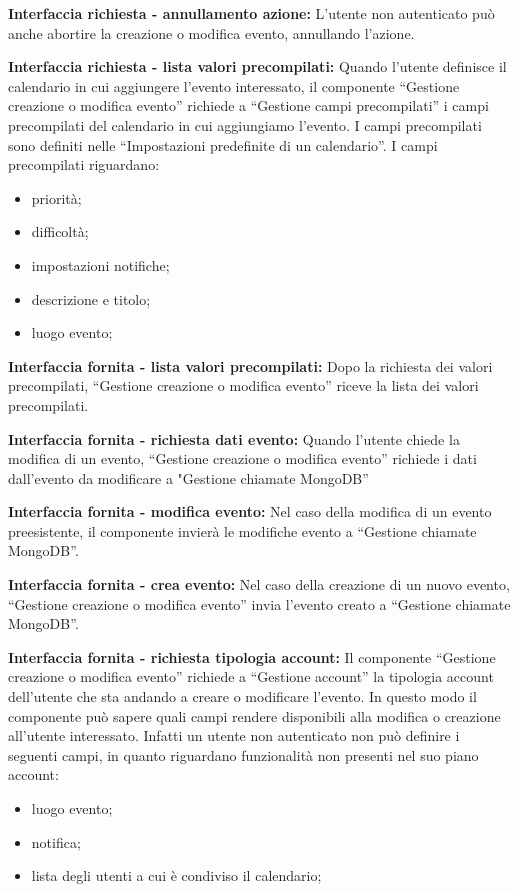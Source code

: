 \begin{listaPersonale}[]{}
    \textbf{Interfaccia richiesta - annullamento azione:} L'utente non autenticato può anche abortire la creazione o modifica evento, annullando l'azione.

    \textbf{Interfaccia richiesta - lista valori precompilati:} Quando l'utente definisce il calendario in cui aggiungere l'evento interessato, il componente “Gestione creazione o modifica evento” richiede a “Gestione campi precompilati” i campi precompilati del calendario in cui aggiungiamo l'evento. I campi precompilati sono definiti nelle “Impostazioni predefinite di un calendario”.
    I campi precompilati riguardano:
    \begin{itemize}
        \item priorità;
        \item difficoltà;
        \item impostazioni notifiche;
        \item descrizione e titolo;
        \item luogo evento;
    \end{itemize}

    \textbf{Interfaccia fornita - lista valori precompilati:}  Dopo la richiesta dei valori precompilati, “Gestione creazione o modifica evento” riceve la lista dei valori precompilati.

    \textbf{Interfaccia fornita - richiesta dati evento:} Quando l'utente chiede la modifica di un evento, “Gestione creazione o modifica evento” richiede i dati dall'evento da modificare a "Gestione chiamate MongoDB”

    \textbf{Interfaccia fornita - modifica evento:} Nel caso della modifica di un evento preesistente, il componente invierà le modifiche evento a “Gestione chiamate MongoDB”.

    \textbf{Interfaccia fornita - crea evento:} Nel caso della creazione di un nuovo evento, “Gestione creazione o modifica evento” invia l'evento creato a “Gestione chiamate MongoDB”.

    \textbf{Interfaccia fornita - richiesta tipologia account:} Il componente “Gestione creazione o modifica evento” richiede a “Gestione account”  la tipologia account dell'utente che sta andando a creare o modificare l'evento. In questo modo il componente può sapere quali campi rendere disponibili alla modifica o creazione all'utente interessato. Infatti un utente non autenticato non può definire i seguenti campi, in quanto riguardano funzionalità non presenti nel suo piano account:
    \begin{itemize}
        \item luogo evento;
        \item notifica;
        \item lista degli utenti a cui è condiviso il calendario;
    \end{itemize}


\end{listaPersonale}
